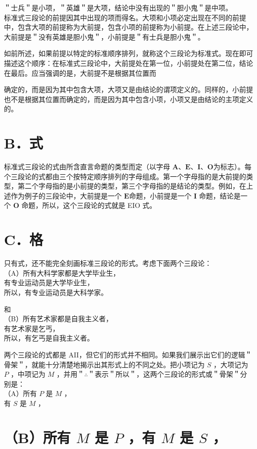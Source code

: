 ＂士兵＂是小项，＂英雄＂是大项，结论中没有出现的＂胆小鬼＂是中项。\\
标准式三段论的前提因其中出现的项而得名。大项和小项必定出现在不同的前提中，包含大项的前提称为大前提，包含小项的前提称为小前提。在上述三段论中，大前提是＂没有英雄是胆小鬼＂，小前提是＂有士兵是胆小鬼＂。

如前所述，如果前提以特定的标准顺序排列，就称这个三段论为标准式。现在即可描述这个顺序：在标准式三段论中，大前提处在第一位，小前提处在第二位，结论在最后。应当强调的是，大前提不是根据其位置而

确定的，而是因为其中包含大项，大项又是由结论的谓项定义的。同样的，小前提也不是根据其位置而确定的，而是因为其中包含小项，小项又是由结论的主项定义的。

\section*{B．式}
标准式三段论的式由所含直言命题的类型而定（以字母 $\mathbf{A 、 E 、 I 、 O}$为标志）。每个三段论的式都由三个按特定顺序排列的字母组成。第一个字母指的是大前提的类型，第二个字母指的是小前提的类型，第三个字母指的是结论的类型。例如，在上述作为例子的三段论中，大前提是一个 $\mathbf{E}$命题，小前提是一个 $\mathbf{I}$ 命题，结论是一个 $\mathbf{O}$ 命题，所以，这个三段论的式就是 EIO 式。

\section*{C．格}
只有式，还不能完全刻画标准三段论的形式。考虑下面两个三段论：\\
（A）所有大科学家都是大学毕业生，\\
有专业运动员是大学毕业生，\\
所以，有专业运动员是大科学家。

和\\
（B）所有艺术家都是自我主义者，\\
有艺术家是乞丐，\\
所以，有乞丐是自我主义者。

两个三段论的式都是 AII，但它们的形式并不相同。如果我们展示出它们的逻辑＂骨架＂，就能十分清楚地揭示出其形式上的不同之处。把小项记为 $S$ ，大项记为 $P$ ，中项记为 $M$ ，并用＂$\therefore$＂表示＂所以＂，这两个三段论的形式或＂骨架＂分别是：\\
（A）所有 $P$ 是 $M$ ，\\
有 $S$ 是 $M$ ，

\section*{（B）所有 $M$ 是 $P$ ，有 $M$ 是 $S$ ，}
